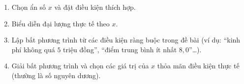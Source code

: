 \begin{enumerate}
\item Chọn ẩn số $x$ và đặt điều kiện thích hợp.
\item Biểu diễn đại lượng thực tế theo $x$.
\item Lập bất phương trình từ các điều kiện ràng buộc trong đề bài (ví dụ: ``kinh phí không quá $5$ triệu đồng'', ``điểm trung bình ít nhất $8{,}0$''\dots).
\item Giải bất phương trình và chọn các giá trị của $x$ thỏa mãn điều kiện thực tế (thường là số nguyên dương).
\end{enumerate}
